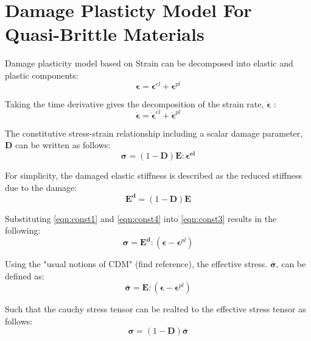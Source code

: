 \section{Damage Plasticty Model For Quasi-Brittle Materials}

Damage plasticity model based on 
Strain can be decomposed into elastic and plastic components:
\begin{equation}
\label{eqn:const1}
\boldsymbol{\epsilon} = \boldsymbol{\epsilon}^{el} + \boldsymbol{\epsilon}^{pl}
\end{equation}

Taking the time derivative gives the decomposition of the strain rate, $\boldsymbol{\dot{\epsilon}}$ :
\begin{equation}
\label{eqn:const2}
\boldsymbol{\dot{\epsilon}} = \boldsymbol{\dot{\epsilon}}^{el} + \boldsymbol{\dot{\epsilon}}^{pl}
\end{equation}

The constitutive stress-strain relationship including a scalar damage parameter, $\mathbf{D}$ can be written as follows:
\begin{equation}
\label{eqn:const3}
\boldsymbol{\sigma} = (1-\mathbf{D})\mathbf{E}:\boldsymbol{\epsilon^{el}}
\end{equation}

For simplicity, the damaged elastic stiffness is described as the reduced stiffness due to the damage:
\begin{equation}
\label{eqn:const4}
\mathbf{E^d} = (1-\mathbf{D})\mathbf{E}
\end{equation}

Substituting \ref{eqn:const1} and \ref{eqn:const4} into \ref{eqn:const3} results in the following:
\begin{equation}
\label{eqn:const5}
\boldsymbol{\sigma} = \mathbf{E^d}:(\boldsymbol{\epsilon}-\boldsymbol{\epsilon}^{pl})
\end{equation}

Using the "usual notions of CDM" (find reference), the effective stress. $\boldsymbol{\bar{\sigma}}$, can be defined as:
\begin{equation}
\label{eqn:const6}
\boldsymbol{\bar{\sigma}} = \mathbf{E}:(\boldsymbol{\epsilon}-\boldsymbol{\epsilon}^{pl})
\end{equation}

Such that the cauchy stress tensor can be realted to the effective stress tensor as follows:
\begin{equation}
\label{eqn:const7}
\boldsymbol{\sigma} = (1-\mathbf{D})\boldsymbol{\bar{\sigma}}
\end{equation}

